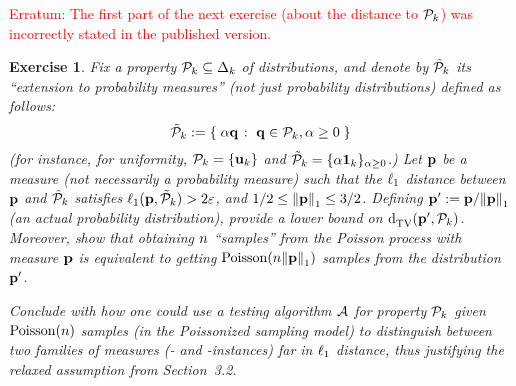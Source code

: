 \documentclass[biber,plain]{nowfnt} %
\newtheorem{question}{Exercise}[chapter]
\begin{document}
\noindent \textcolor{red}{Erratum: The first part of the next exercise (about the distance to $\property_\ab$) was incorrectly stated in the published version.}
\begin{question}\label{exo:notrealproba:lb}
Fix a property $\property_\ab \subseteq \distribs{\ab}$ of distributions, and denote by $\tilde{\property}_\ab$ its ``extension to probability measures'' (not just probability distributions) defined as follows:
\begin{equation}
	\tilde{\property}_\ab \eqdef \setOfSuchThat{ \alpha\q }{ \q\in\property_\ab, \alpha \geq 0 }
\end{equation}
(for instance, for uniformity, $\property_\ab=\{\uniformOn{\ab}\}$ and $\tilde{\property}_\ab = \{\alpha \textbf{1}_\ab\}_{\alpha \geq 0}$.) 
Let $\p$ be a measure (not necessarily a probability measure) such that the $\lp[1]$ distance between $\p$ and $\tilde{\property}_\ab$ satisfies $\lp[1](\p,\tilde{\property}_\ab) > 2\dst$, and $1/2\leq \normone{\p} \leq 3/2$. Defining $\p' \eqdef \p/\normone{\p}$ (an actual probability distribution), provide a lower bound on $\totalvardist{\p'}{\property_\ab}$. Moreover, show that obtaining $\ns$ ``samples'' from the Poisson process with measure $\p$ is equivalent to getting $\poisson{\ns\normone{\p}}$ samples from the distribution $\p'$.

Conclude with how one could use a testing algorithm $\Algo$ for property $\property_\ab$ given $\poisson{\ns}$ samples (\ie in the Poissonized sampling model) to distinguish between two families of measures (\yes- and \no-instances) far in $\lp[1]$ distance, thus justifying the relaxed assumption from Section~3.2.
\end{question}
\end{document}

